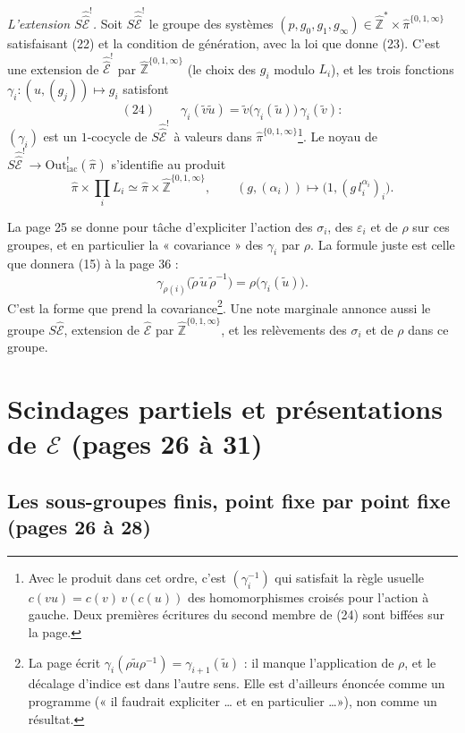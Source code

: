 \documentclass[11pt,a4paper]{article}
\begin{document}
\emph{L'extension $S\hat{\hat{\mathcal{E}}}^{!}$.} Soit
$S\hat{\hat{\mathcal{E}}}^{!}$ le groupe des systèmes $(p, g_0, g_1, g_\infty)
\in \widehat{\mathbb{Z}}^{*} \times \widehat{\pi}^{\{0, 1, \infty\}}$ satisfaisant
(22) et la condition de génération, avec la loi que donne (23). C'est une
extension de $\hat{\hat{\mathcal{E}}}^{!}$ par $\widehat{\mathbb{Z}}^{\{0,1,\infty\}}$
(le choix des $g_i$ modulo $L_i$), et les trois fonctions $\gamma_i :
(u, (g_j)) \mapsto g_i$ satisfont
\[
(24)\qquad \gamma_i(\tilde v\tilde u) = \tilde v\bigl(\gamma_i(\tilde u)\bigr)\,
\gamma_i(\tilde v) :
\]
$(\gamma_i)$ est un $1$-cocycle de $S\hat{\hat{\mathcal{E}}}^{!}$ à valeurs dans
$\widehat{\pi}^{\{0,1,\infty\}}$\footnote{Avec le produit dans cet ordre, c'est
$(\gamma_i^{-1})$ qui satisfait la règle usuelle $c(vu) = c(v)\,v(c(u))$ des
homomorphismes croisés pour l'action à gauche. Deux premières écritures du
second membre de (24) sont biffées sur la page.}. Le noyau de
$S\hat{\hat{\mathcal{E}}}^{!} \to \mathrm{Out}^{!}_{\mathrm{lac}}(\widehat{\pi})$
s'identifie au produit
\[
\widehat{\pi} \times \prod_{i} L_i \simeq \widehat{\pi} \times
\widehat{\mathbb{Z}}^{\{0,1,\infty\}}, \qquad (g, (\alpha_i)) \longmapsto
\bigl(1, (g\, l_i^{\alpha_i})_i\bigr).
\]

La page 25 se donne pour tâche d'expliciter l'action des $\sigma_i$, des
$\varepsilon_i$ et de $\rho$ sur ces groupes, et en particulier la
« covariance » des $\gamma_i$ par $\rho$. La formule juste est celle que
donnera (15) à la page 36 :
\[
\gamma_{\rho(i)}\bigl(\tilde\rho\,\tilde u\,\tilde\rho^{-1}\bigr) =
\rho\bigl(\gamma_i(\tilde u)\bigr).
\]
C'est la forme que prend la covariance\footnote{La page écrit
$\gamma_i(\rho\tilde u\rho^{-1}) = \gamma_{i+1}(\tilde u)$ : il manque
l'application de $\rho$, et le décalage d'indice est dans l'autre sens. Elle
est d'ailleurs énoncée comme un programme (« il faudrait expliciter \ldots{} et en
particulier \ldots »), non comme un résultat.}.
Une note marginale annonce aussi le groupe $S\widehat{\mathcal{E}}$, extension
de $\widehat{\mathcal{E}}$ par $\widehat{\mathbb{Z}}^{\{0,1,\infty\}}$, et les
relèvements des $\sigma_i$ et de $\rho$ dans ce groupe.

\section*{Scindages partiels et présentations de $\mathcal{E}$ (pages 26 à 31)}

\subsection*{Les sous-groupes finis, point fixe par point fixe (pages 26 à 28)}
\end{document}

